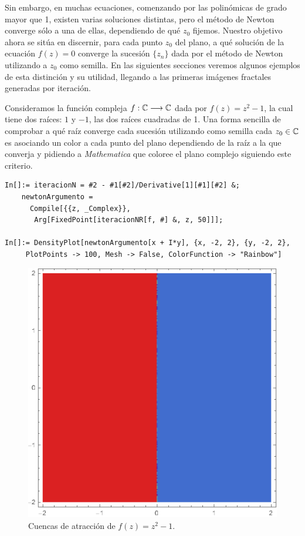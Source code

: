 Sin embargo, en muchas ecuaciones, comenzando por las polinómicas de grado mayor que 1, existen varias soluciones distintas, pero el método de Newton converge sólo a una de ellas, dependiendo de qué $z_0$ fijemos. Nuestro objetivo ahora se sitúa en discernir, para cada punto $z_0$ del plano, a qué solución de la ecuación $f(z)=0$ converge la sucesión $\{z_n\}$ dada por el método de Newton utilizando a $z_0$ como semilla. En las siguientes secciones veremos algunos ejemplos de esta distinción y su utilidad, llegando a las primeras imágenes fractales generadas por iteración.

\begin{ejemplo}
\label{ejemplo:cuencas-1}
Consideramos la función compleja $f:\mathbb{C}\longrightarrow\mathbb{C}$ dada por $f(z)=z^2-1$, la cual tiene dos raíces: $1$ y $-1$, las dos raíces cuadradas de 1. Una forma sencilla de comprobar a qué raíz converge cada sucesión utilizando como semilla cada $z_0\in\mathbb{C}$ es asociando un color a cada punto del plano dependiendo de la raíz a la que converja y pidiendo a \textit{Mathematica} que coloree el plano complejo siguiendo este criterio.

\begin{verbatim}
In[]:= iteracionN = #2 - #1[#2]/Derivative[1][#1][#2] &;
    newtonArgumento = 
      Compile[{{z, _Complex}}, 
       Arg[FixedPoint[iteracionNR[f, #] &, z, 50]]];
    
In[]:= DensityPlot[newtonArgumento[x + I*y], {x, -2, 2}, {y, -2, 2}, 
     PlotPoints -> 100, Mesh -> False, ColorFunction -> "Rainbow"] 
\end{verbatim}

\begin{figure} [ht]
\centering
\includegraphics[scale = 0.4]{img/cuencas-1.png}
\caption{Cuencas de atracción de $f(z)=z^2-1$.}
    \label{fig:cuencas-1}
\end{figure}


\end{ejemplo}
